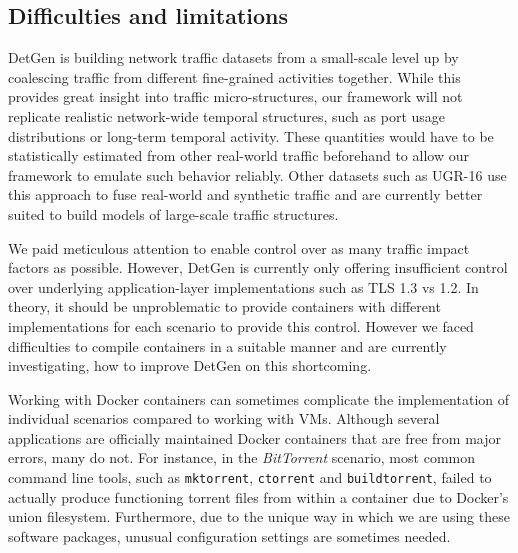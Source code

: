 \documentclass[sigconf]{acmart}
\begin{document}


\subsection{Difficulties and limitations}

DetGen is building network traffic datasets from a small-scale level up by coalescing traffic from different fine-grained activities together. While this provides great insight into traffic micro-structures, our framework will not replicate realistic network-wide temporal structures, such as port usage distributions or long-term temporal activity. These quantities would have to be statistically estimated from other real-world traffic beforehand to allow our framework to emulate such behavior reliably. Other datasets such as UGR-16 use this approach to fuse real-world and synthetic traffic and are currently better suited to build models of large-scale traffic structures.

We paid meticulous attention to enable control over as many traffic impact factors as possible. However, DetGen is currently only offering insufficient control over underlying application-layer implementations such as TLS 1.3 vs 1.2. In theory, it should be unproblematic to provide containers with different implementations for each scenario to provide this control. However we faced difficulties to compile containers in a suitable manner and are currently investigating, how to improve DetGen on this shortcoming.

Working with Docker containers can sometimes complicate the implementation of individual scenarios compared to working with VMs. Although several applications are officially maintained Docker containers that are free from major errors, many do not. For instance, in the \textit{BitTorrent} scenario, most common command line tools, such as \texttt{mktorrent}, \texttt{ctorrent} and \texttt{buildtorrent}, failed to actually produce functioning torrent files from within a container due to Docker's union filesystem. Furthermore, due to the unique way in which we are using these software packages, unusual configuration settings are sometimes needed. %
\end{document}

